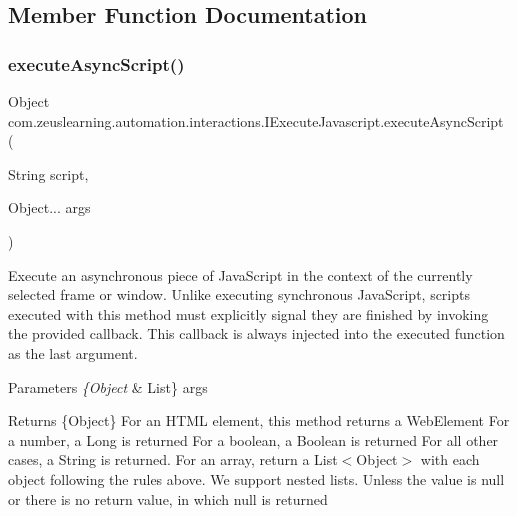 \subsection{Member Function Documentation}
\hypertarget{interfacecom_1_1zeuslearning_1_1automation_1_1interactions_1_1IExecuteJavascript_a87933d4cbc9994eb6fedfa5b2c926802}{}\label{interfacecom_1_1zeuslearning_1_1automation_1_1interactions_1_1IExecuteJavascript_a87933d4cbc9994eb6fedfa5b2c926802} 
\subsubsection{\texorpdfstring{execute\+Async\+Script()}{executeAsyncScript()}}
{\footnotesize\ttfamily Object com.\+zeuslearning.\+automation.\+interactions.\+I\+Execute\+Javascript.\+execute\+Async\+Script (\begin{DoxyParamCaption}\item[{String}]{script,  }\item[{Object...}]{args }\end{DoxyParamCaption})}

Execute an asynchronous piece of Java\+Script in the context of the currently selected frame or window. Unlike executing synchronous Java\+Script, scripts executed with this method must explicitly signal they are finished by invoking the provided callback. This callback is always injected into the executed function as the last argument.


\begin{DoxyParams}{Parameters}
{\em \{\+Object} & List\} args \\
\hline
\end{DoxyParams}
\begin{DoxyReturn}{Returns}
\{Object\} For an H\+T\+ML element, this method returns a Web\+Element For a number, a Long is returned For a boolean, a Boolean is returned For all other cases, a String is returned. For an array, return a List$<$\+Object$>$ with each object following the rules above. We support nested lists. Unless the value is null or there is no return value, in which null is returned 
\end{DoxyReturn}


